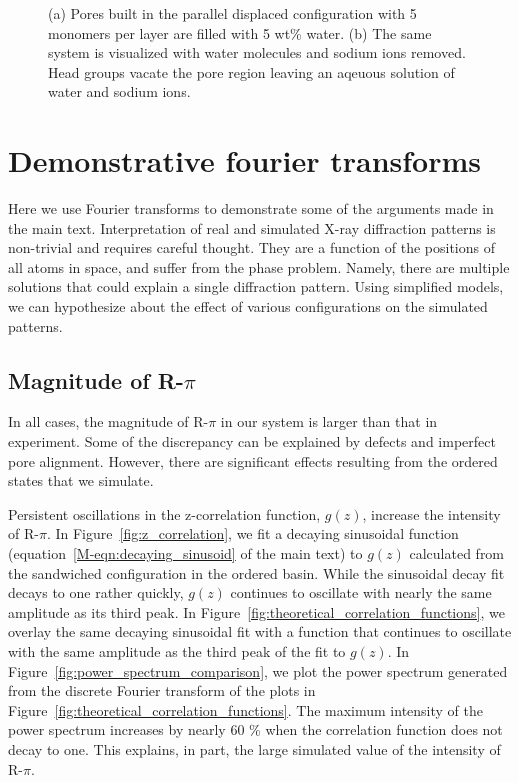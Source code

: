 \documentclass[journal=jpcbfk,manusciprt=article]{achemso}
\begin{document}
\begin{figure}[!htb]
\begin{subfigure}{0.45\textwidth}
                \caption{}\label{fig:water_removed}
        \end{subfigure}
  \caption{(a) Pores built in the parallel displaced configuration with 5
	  monomers per layer are filled with 5 wt\% water. (b) The same system is
	  visualized with water molecules and sodium ions removed. Head groups vacate the
	  pore region leaving an aqeuous solution of water and sodium ions.}\label{fig:water_pores}
  \end{figure}
  
  \section{Demonstrative fourier transforms}\label{section:fourier}
  
  Here we use Fourier transforms to demonstrate some of the arguments made in 
  the main text. Interpretation of real and simulated X-ray diffraction patterns
  is non-trivial and requires careful thought. They are a function of the positions
  of all atoms in space, and suffer from the phase problem. Namely, there are multiple
  solutions that could explain a single diffraction pattern. Using simplified models, 
  we can hypothesize about the effect of various configurations on the simulated patterns.
  
  \subsection{Magnitude of R-$\pi$}\label{section:rpi_ft}
  
  In all cases, the magnitude of R-$\pi$ in our system is larger than that in experiment.
  Some of the discrepancy can be explained by defects and imperfect pore alignment. 
  However, there are significant effects resulting from the ordered states that we simulate.
  
  Persistent oscillations in the z-correlation function, $g(z)$, increase the intensity of R-$\pi$. 
  In Figure~\ref{fig:z_correlation}, we fit a decaying sinusoidal function 
  (equation~\ref{M-eqn:decaying_sinusoid} of the main text) to $g(z)$ calculated from the
  sandwiched configuration in the ordered basin. While the sinusoidal decay fit decays to one
  rather quickly, $g(z)$ continues to oscillate with nearly the same amplitude as its third peak. 
  In Figure~\ref{fig:theoretical_correlation_functions}, we overlay the same decaying sinusoidal
  fit with a function that continues to oscillate with the same amplitude as the third peak of
  the fit to $g(z)$. In Figure~\ref{fig:power_spectrum_comparison}, we plot the power spectrum
  generated from the discrete Fourier transform of the plots in Figure~\ref{fig:theoretical_correlation_functions}. 
  The maximum intensity of the power spectrum increases by nearly 60 \% when the correlation 
  function does not decay to one. This explains, in part, the large simulated value of the
  intensity of R-$\pi$.
  
\end{document}
